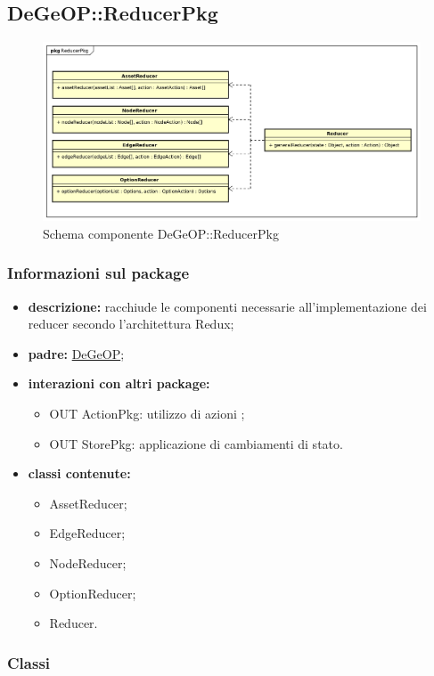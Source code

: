 \subsection{DeGeOP::ReducerPkg}
\label{pkg::ReducerPkg}
\begin{figure}[H]
	\centering
	\includegraphics[width=\textwidth]{img/PkgDiagram/ReducerPkg.png}
	\caption{Schema componente DeGeOP::ReducerPkg}
\end{figure}
\subsubsection{Informazioni sul package}
\begin{itemize}
	\item \textbf{descrizione:} racchiude le componenti necessarie all'implementazione dei reducer secondo l'architettura Redux;
	\item \textbf{padre:} \hyperref[pkg::DeGeOP]{DeGeOP};
	\item \textbf{interazioni con altri package:} 
	\begin{itemize}
		\item OUT ActionPkg: utilizzo di azioni ;
		\item OUT StorePkg: applicazione di cambiamenti di stato.
	\end{itemize}
	\item \textbf{classi contenute:}
	\begin{itemize}
		\item AssetReducer;
		\item EdgeReducer;
		\item NodeReducer;
		\item OptionReducer;
		\item Reducer.
	\end{itemize}
\end{itemize}
\subsubsection{Classi}
